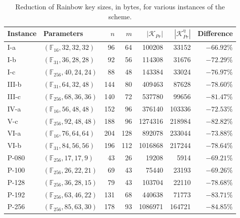 \documentclass[draft, 12pt, a4paper, oneside]{memoir}
\theoremstyle{definition}
\theoremstyle{remark}
\begin{document}
\begin{table}[htbp]
  \renewcommand{\arraystretch}{1.2}
  \setlength{\tabcolsep}{6.5pt}
  \centering
  \caption{Reduction of Rainbow key sizes, in bytes, for various instances of the scheme.}\label{tab:1}
  \begin{tabular}{*{2}{l}*{5}{r}}
    \toprule
    Instance & Parameters & $n$ & $m$ & $|\mathcal{K}_{Pr}|$ & $|\mathcal{K}_{Pr} ^{\eta}|$ & Difference \\ \midrule
    I-a    & $(\mathbb{F}_{ 16}, 32, 32, 32)$  &   96 &   64 &   100208 &   33152 & $-66.92\%$ \\
    I-b    & $(\mathbb{F}_{ 31}, 36, 28, 28)$  &   92 &   56 &   114308 &   31676 & $-72.29\%$ \\
    I-c    & $(\mathbb{F}_{256}, 40, 24, 24)$  &   88 &   48 &   143384 &   33024 & $-76.97\%$ \\
    III-b  & $(\mathbb{F}_{ 31}, 64, 32, 48)$  &  144 &   80 &   409463 &   87628 & $-78.60\%$ \\
    III-c  & $(\mathbb{F}_{256}, 68, 36, 36)$  &  140 &   72 &   537780 &   99656 & $-81.47\%$ \\
    IV-a   & $(\mathbb{F}_{ 16}, 56, 48, 48)$  &  152 &   96 &   376140 &  103336 & $-72.53\%$ \\
    V-c    & $(\mathbb{F}_{256}, 92, 48, 48)$  &  188 &   96 &  1274316 &  218984 & $-82.82\%$ \\
    VI-a   & $(\mathbb{F}_{ 16}, 76, 64, 64)$  &  204 &  128 &   892078 &  233044 & $-73.88\%$ \\
    VI-b   & $(\mathbb{F}_{ 31}, 84, 56, 56)$  &  196 &  112 &  1016868 &  217244 & $-78.64\%$ \\
    P-080  & $(\mathbb{F}_{256}, 17, 17,  9)$  &   43 &   26 &    19208 &    5914 & $-69.21\%$ \\
    P-100  & $(\mathbb{F}_{256}, 26, 22, 21)$  &   69 &   43 &    75440 &   23193 & $-69.26\%$ \\
    P-128  & $(\mathbb{F}_{256}, 36, 28, 15)$  &   79 &   43 &   103704 &   22110 & $-78.68\%$ \\
    P-192  & $(\mathbb{F}_{256}, 63, 46, 22)$  &  131 &   68 &   440638 &   71773 & $-83.71\%$ \\
    P-256  & $(\mathbb{F}_{256}, 85, 63, 30)$  &  178 &   93 &  1086971 &  164721 & $-84.85\%$ \\
    \bottomrule
  \end{tabular}
\end{table}
\end{document}
